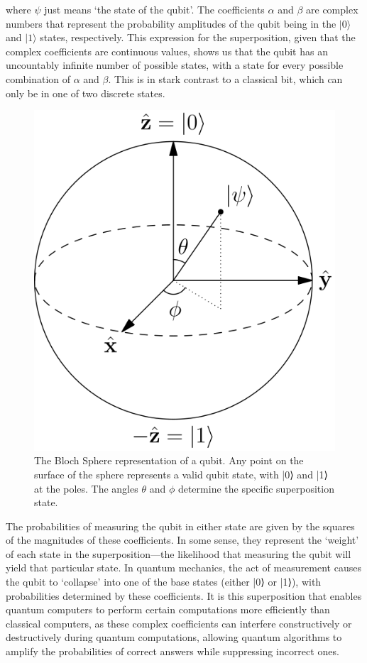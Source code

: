 \documentclass{elbioimp2}
\begin{document}
where $\psi$ just means `the state of the qubit'. The coefficients $\alpha$ and $\beta$ are complex numbers that represent the probability amplitudes of the qubit being in the $|0\rangle$ and $|1\rangle$ states, respectively. This expression for the superposition, given that the complex coefficients are continuous values, shows us that the qubit has an uncountably infinite number of possible states, with a state for every possible combination of $\alpha$ and $\beta$. This is in stark contrast to a classical bit, which can only be in one of two discrete states.
\begin{figure}[htbp]
  \centering
  \includegraphics[width=0.75\columnwidth]{assets/bloch-sphere.png}
  \caption{The Bloch Sphere representation of a qubit. Any point on the surface of the sphere represents a valid qubit state, with |0⟩ and |1⟩ at the poles. The angles $\theta$ and $\phi$ determine the specific superposition state.}\label{fig:bloch-sphere}
\end{figure}

The probabilities of measuring the qubit in either state are given by the squares of the magnitudes of these coefficients. In some sense, they represent the `weight' of each state in the superposition—the likelihood that measuring the qubit will yield that particular state. In quantum mechanics, the act of measurement causes the qubit to `collapse' into one of the base states (either |0⟩ or |1⟩), with probabilities determined by these coefficients. It is this superposition that enables quantum computers to perform certain computations more efficiently than classical computers, as these complex coefficients can interfere constructively or destructively during quantum computations, allowing quantum algorithms to amplify the probabilities of correct answers while suppressing incorrect ones.
\end{document}

